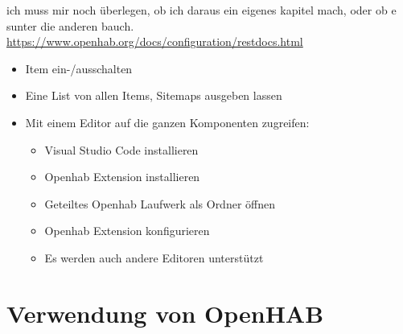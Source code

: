 ich muss mir noch überlegen, ob ich daraus ein eigenes kapitel mach, oder ob e sunter die anderen bauch.
\url{https://www.openhab.org/docs/configuration/restdocs.html}
\begin{itemize}
	\item Item ein-/ausschalten
	\item Eine List von allen Items, Sitemaps ausgeben lassen
	\item Mit einem Editor auf die ganzen Komponenten zugreifen:
	\begin{itemize}
		\item Visual Studio Code installieren
		\item Openhab Extension installieren
		\item Geteiltes Openhab Laufwerk als Ordner öffnen
		\item Openhab Extension konfigurieren
		\item Es werden auch andere Editoren unterstützt
	\end{itemize}
\end{itemize}

\section{Verwendung von OpenHAB}
